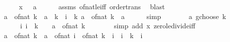 \begin{isabellebody}
%
\isadelimproof
%
\endisadelimproof
%
\isatagproof
{}\isamarkupfalse%
\ {\isacharminus}{\kern0pt}\isanewline
\ \ \isamarkupfalse%
\ x{\isacharcolon}{\kern0pt}\ {\isachardoublequoteopen}{}\ {\isasymle}\ a{\isachardoublequoteclose}\isanewline
\ \ \ \ \isamarkupfalse%
\ assms\ of{\isacharunderscore}{\kern0pt}nat{\isacharunderscore}{\kern0pt}{}{\isacharunderscore}{\kern0pt}le{\isacharunderscore}{\kern0pt}iff\ order{\isacharunderscore}{\kern0pt}trans\ \isamarkupfalse%
\ blast\isanewline
\ \ \isamarkupfalse%
\ {\isachardoublequoteopen}{\isacharparenleft}{\kern0pt}a\ {\isacharslash}{\kern0pt}\ of{\isacharunderscore}{\kern0pt}nat\ k\ {\isacharcolon}{\kern0pt}{\isacharcolon}{\kern0pt}\ {\isacharprime}{\kern0pt}a{\isacharparenright}{\kern0pt}\ {\isacharcircum}{\kern0pt}\ k\ {\isacharequal}{\kern0pt}\ {\isacharparenleft}{\kern0pt}{\isasymProd}i\ {\isacharequal}{\kern0pt}\ {}{\isachardot}{\kern0pt}{\isachardot}{\kern0pt}{\isacharless}{\kern0pt}k{\isachardot}{\kern0pt}\ a\ {\isacharslash}{\kern0pt}\ of{\isacharunderscore}{\kern0pt}nat\ k\ {\isacharcolon}{\kern0pt}{\isacharcolon}{\kern0pt}\ {\isacharprime}{\kern0pt}a{\isacharparenright}{\kern0pt}{\isachardoublequoteclose}\isanewline
\ \ \ \ \isamarkupfalse%
\ simp\isanewline
\ \ \isamarkupfalse%
\ \isamarkupfalse%
\ {\isachardoublequoteopen}{\isasymdots}\ {\isasymle}\ a\ gchoose\ k{\isachardoublequoteclose}\isanewline
\ \ \isamarkupfalse%
\ {\isacharminus}{\kern0pt}\isanewline
\ \ \ \ \isamarkupfalse%
\ {\isachardoublequoteopen}{\isasymAnd}i{\isachardot}{\kern0pt}\ i\ {\isacharless}{\kern0pt}\ k\ {\isasymLongrightarrow}\ {}\ {\isasymle}\ a\ {\isacharslash}{\kern0pt}\ of{\isacharunderscore}{\kern0pt}nat\ k{\isachardoublequoteclose}\isanewline
\ \ \ \ \ \ \isamarkupfalse%
\ {\isacharparenleft}{\kern0pt}simp\ add{\isacharcolon}{\kern0pt}\ x\ zero{\isacharunderscore}{\kern0pt}le{\isacharunderscore}{\kern0pt}divide{\isacharunderscore}{\kern0pt}iff{\isacharparenright}{\kern0pt}\isanewline
\ \ \ \ \isamarkupfalse%
\ \isamarkupfalse%
\ {\isachardoublequoteopen}a\ {\isacharslash}{\kern0pt}\ of{\isacharunderscore}{\kern0pt}nat\ k\ {\isasymle}\ {\isacharparenleft}{\kern0pt}a\ {\isacharminus}{\kern0pt}\ of{\isacharunderscore}{\kern0pt}nat\ i{\isacharparenright}{\kern0pt}\ {\isacharslash}{\kern0pt}\ of{\isacharunderscore}{\kern0pt}nat\ {\isacharparenleft}{\kern0pt}k\ {\isacharminus}{\kern0pt}\ i{\isacharparenright}{\kern0pt}{\isachardoublequoteclose}\ \ {\isachardoublequoteopen}i\ {\isacharless}{\kern0pt}\ k{\isachardoublequoteclose}\ \ i\isanewline

\end{isabellebody}
